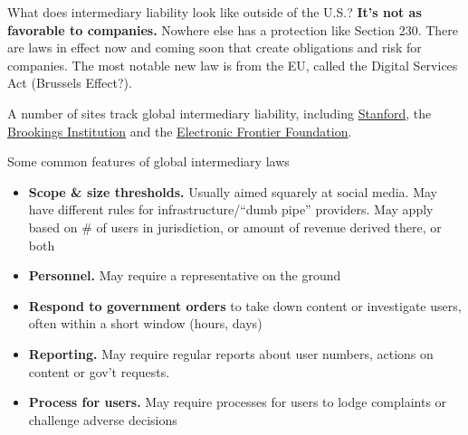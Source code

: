 \documentclass[nobackground,dvipsnames,table]{beamer}
\begin{document}
\begin{frame}{What does intermediary liability look like outside of the U.S.?}
\textbf{It’s not as favorable to companies.} Nowhere else has a protection like Section 230. There are laws in effect now and coming soon that create obligations and risk for companies. The most notable new law is from the EU, called the Digital Services Act (Brussels Effect?).

A number of sites track global intermediary liability, including \href{https://wilmap.stanford.edu/}{Stanford}, the \href{https://www.brookings.edu/articles/online-content-moderation-lessons-from-outside-the-u-s/}{Brookings Institution} and the \href{https://www.eff.org/deeplinks/2022/05/platform-liability-trends-around-globe-taxonomy-and-tools-intermediary-liability}{Electronic Frontier Foundation}. 

\textbf{\color{red}{Warning:}} 


\end{frame}

\begin{frame}{Some common features of global intermediary laws}
\begin{itemize}
    \item \textbf{Scope \& size thresholds.} Usually aimed squarely at social media. May have different rules for infrastructure/“dumb pipe” providers. May apply based on \# of users in jurisdiction, or amount of revenue derived there, or both 
    \item \textbf{Personnel.} May require a representative on the ground
    \item \textbf{Respond to government orders} to take down content or investigate users, often within a short window (hours, days)
    \item \textbf{Reporting.} May require regular reports about user numbers, actions on content or gov’t requests.
    \item \textbf{Process for users.} May require processes for users to lodge complaints or challenge adverse decisions
\end{itemize}

\end{frame}
\end{document}

